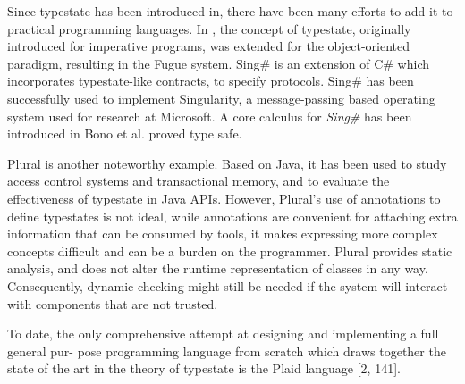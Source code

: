 Since typestate has been introduced in\cite{typestates}, there have been many efforts to add it to practical programming languages.
In \cite{FahndrichM:typo}, the concept of typestate, originally introduced for imperative programs, was extended for the object-oriented paradigm, resulting in the Fugue system.
Sing\# \cite{FahndrichM:lansfr} is an extension of C\# which incorporates typestate-like contracts, to specify protocols. Sing\# has been successfully used to implement Singularity, a message-passing based operating system used for research at Microsoft. A core calculus for \emph{Sing\#} has been introduced in Bono {et al.} \cite{BonoV:typcmp} proved type safe.

Plural\cite{Bierhoff.etal:practicalapichecking} is another noteworthy example. Based on Java, it has been used to study access control systems\cite{BierhoffAldrich:aliasedobjects} and transactional memory\cite{Beckman.etal:atomicblockstypestates}, and to evaluate the effectiveness of typestate in Java APIs\cite{Bierhoff.etal:practicalapichecking}. However, Plural's use of annotations to define typestates is not ideal, while annotations are convenient for attaching extra information that can be consumed by tools, it makes expressing more complex concepts difficult and can be a burden on the programmer. Plural provides static analysis, and does not alter the runtime representation of classes in any way.  Consequently, dynamic checking might still be needed if the system will interact with components that are not trusted.




To date, the only comprehensive attempt at designing and implementing a full general pur- pose programming language from scratch which draws together the state of the art in the theory of typestate is the Plaid language [2, 141]. 

